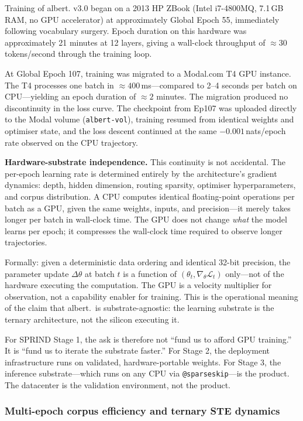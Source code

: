 \documentclass[11pt,a4paper]{article}
\begin{document}
Training of albert. v3.0 began on a 2013 HP ZBook (Intel i7-4800MQ, 7.1\,GB RAM,
no GPU accelerator) at approximately Global Epoch 55, immediately following
vocabulary surgery. Epoch duration on this hardware was approximately 21 minutes
at 12 layers, giving a wall-clock throughput of $\approx 30$ tokens/second through
the training loop.

At Global Epoch 107, training was migrated to a Modal.com T4 GPU instance.
The T4 processes one batch in $\approx 400$\,ms---compared to 2--4 seconds per
batch on CPU---yielding an epoch duration of $\approx 2$ minutes. The migration
produced no discontinuity in the loss curve. The checkpoint from Ep107 was uploaded
directly to the Modal volume (\texttt{albert-vol}), training resumed from identical
weights and optimiser state, and the loss descent continued at the same
$-0.001$\,nats/epoch rate observed on the CPU trajectory.

\textbf{Hardware-substrate independence.}
This continuity is not accidental. The per-epoch learning rate is determined
entirely by the architecture's gradient dynamics: depth, hidden dimension, routing
sparsity, optimiser hyperparameters, and corpus distribution. A CPU computes
identical floating-point operations per batch as a GPU, given the same weights,
inputs, and precision---it merely takes longer per batch in wall-clock time. The
GPU does not change \emph{what} the model learns per epoch; it compresses the
wall-clock time required to observe longer trajectories.

Formally: given a deterministic data ordering and identical 32-bit precision,
the parameter update $\Delta\theta$ at batch $t$ is a function of
$(\theta_t, \nabla_\theta \mathcal{L}_t)$ only---not of the hardware executing
the computation. The GPU is a velocity multiplier for observation, not a
capability enabler for training. This is the operational meaning of the claim
that albert.\ is substrate-agnostic: the learning substrate is the ternary
architecture, not the silicon executing it.

For SPRIND Stage 1, the ask is therefore not ``fund us to afford GPU training.''
It is ``fund us to iterate the substrate faster.'' For Stage 2, the deployment
infrastructure runs on validated, hardware-portable weights. For Stage 3, the
inference substrate---which runs on any CPU via \texttt{@sparseskip}---is the
product. The datacenter is the validation environment, not the product.

\subsubsection{Multi-epoch corpus efficiency and ternary STE dynamics}
\label{subsubsec:multiepoch}
\end{document}
